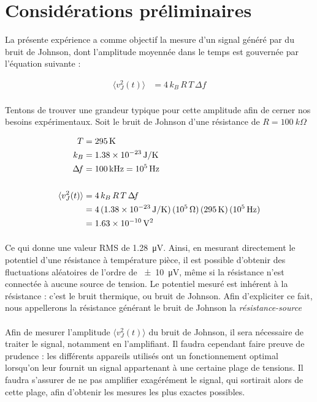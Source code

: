 \documentclass[12pt,oneside,letterpaper]{article}
\begin{document}
\section{Considérations préliminaires}

La présente expérience a comme objectif la mesure d'un signal généré par du bruit de Johnson, dont l'amplitude moyennée dans le temps est gouvernée par l'équation suivante :

\begin{align*}
\langle v_{J}^{2}\!\left(t\right) \rangle &= 4\,k_B\,R\,T\,\Delta\!f
\end{align*}


\paragraph{}Tentons de trouver une grandeur typique pour cette amplitude afin de cerner nos besoins expérimentaux. Soit le bruit de Johnson d'une résistance de $R=\SI{100}{k\Omega}$

\begin{align*}
T &= \SI{295}{K}\\
k_B &= \SI{1,38e{-23}}{J/K}\\
\Delta\!f &= \SI{100}{kHz}=\SI{e5}{Hz}\\ \\
\langle v_{J}^{2}\!\left(t\right) \rangle &= 4\,k_B\,R\,T\,\Delta\!f \\
&=4\,(\SI{1.38e{-23}}{J/K})\,(\SI{e5}{\Omega})\,(\SI{295}{K})\,(\SI{e5}{Hz}) \\
&=\SI{1.63e{-10}}{V^2}
\end{align*}


\paragraph{}Ce qui donne une valeur RMS de \SI{1.28}{\micro V}. Ainsi, en mesurant directement le potentiel d'une résistance à température pièce, il est possible d'obtenir des fluctuations aléatoires de l'ordre de \SI{\pm10}{\micro V}, même si la résistance n'est connectée à aucune source de tension. Le potentiel mesuré est inhérent à la résistance : c'est le bruit thermique, ou bruit de Johnson. Afin d'expliciter ce fait, nous appellerons la résistance générant le bruit de Johnson la \emph{résistance-source}


\paragraph{}Afin de mesurer l'amplitude $\langle v_{J}^{2}\!\left(t\right) \rangle$ du bruit de Johnson, il sera nécessaire de traiter le signal, notamment en l'amplifiant. Il faudra cependant faire preuve de prudence : les différents appareils utilisés ont un fonctionnement optimal lorsqu'on leur fournit un signal appartenant à une certaine plage de tensions. Il faudra s'assurer de ne pas amplifier exagérément le signal, qui sortirait alors de cette plage, afin d'obtenir les mesures les plus exactes possibles.
\end{document}

